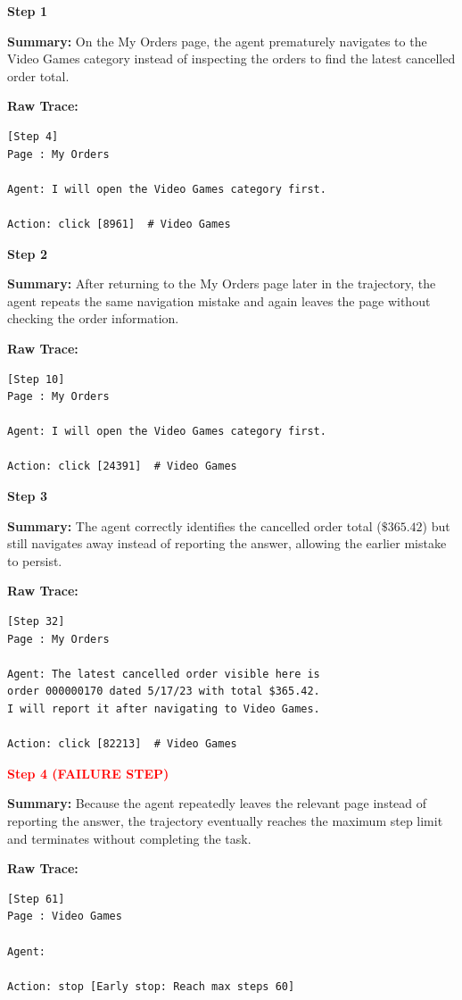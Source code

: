 \documentclass[11pt]{article}
\begin{document}
\begin{tcolorbox}[
breakable,
colback=customwhite,
colframe=custompurple,
title=History Error Accumulation,
fontupper=\fontfamily{pcr}\selectfont\scriptsize
]

\textbf{Step 1}

\textbf{Summary:}  
On the My Orders page, the agent prematurely navigates to the Video Games category instead of inspecting the orders to find the latest cancelled order total.

\textbf{Raw Trace:}
\begin{verbatim}
[Step 4]
Page : My Orders

Agent: I will open the Video Games category first.

Action: click [8961]  # Video Games
\end{verbatim}

\medskip
\textbf{Step 2}

\textbf{Summary:}  
After returning to the My Orders page later in the trajectory, the agent repeats the same navigation mistake and again leaves the page without checking the order information.

\textbf{Raw Trace:}
\begin{verbatim}
[Step 10]
Page : My Orders

Agent: I will open the Video Games category first.

Action: click [24391]  # Video Games
\end{verbatim}

\medskip
\textbf{Step 3}

\textbf{Summary:}  
The agent correctly identifies the cancelled order total ($\$365.42$) but still navigates away instead of reporting the answer, allowing the earlier mistake to persist.

\textbf{Raw Trace:}
\begin{verbatim}
[Step 32]
Page : My Orders

Agent: The latest cancelled order visible here is
order 000000170 dated 5/17/23 with total $365.42.
I will report it after navigating to Video Games.

Action: click [82213]  # Video Games
\end{verbatim}

\medskip
\textbf{\textcolor{red}{Step 4 (FAILURE STEP)}}

\textbf{Summary:}  
Because the agent repeatedly leaves the relevant page instead of reporting the answer, the trajectory eventually reaches the maximum step limit and terminates without completing the task.

\textbf{Raw Trace:}
\begin{verbatim}
[Step 61]
Page : Video Games

Agent:

Action: stop [Early stop: Reach max steps 60]
\end{verbatim}

\end{tcolorbox}
\end{document}
